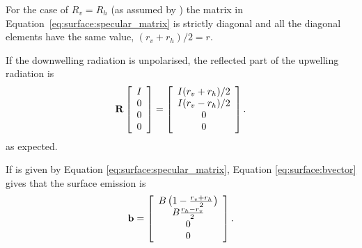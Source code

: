 For the case of $R_v=R_h$ (as assumed by
) the matrix in
Equation~\ref{eq:surface:specular_matrix} is strictly diagonal and all the
diagonal elements have the same value, $(r_v+r_h)/2=r$.

If the downwelling radiation is unpolarised, the reflected part of the
upwelling radiation is
\begin{equation}
  \mathbf{R}
  \left[ \begin{array}{c} I\\0\\0\\0 \end{array} \right] =
  \left[ \begin{array}{c} I(r_v+r_h)/2\\I(r_v-r_h)/2\\0\\0 
  \end{array} \right].
\end{equation}
as expected.


If  is given by Equation \ref{eq:surface:specular_matrix},
Equation \ref{eq:surface:bvector} gives that the surface emission  is
\begin{equation}
  \label{eq:surface:specular_emission}
   \mathbf{b} = \left[\begin{array}{c}
     B\left(1-\frac{r_v+r_h}{2}\right) \\
     B\frac{r_h-r_v}{2} \\
     0\\0
   \end{array}\right].
\end{equation}


